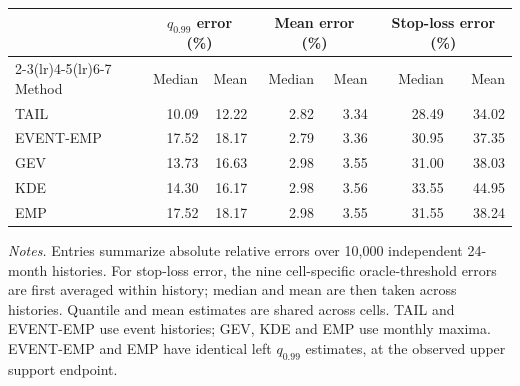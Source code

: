 \documentclass[Times1COL]{WileyNJDv5}
\providecommand{\tablebodyfont}{\small}
\providecommand{\tablefootnotefont}{\small}
\begin{document}
\clearpage
\begingroup
\centering
{}
\label{tab:table_2}
{\tablebodyfont
\setlength{\tabcolsep}{4pt}
\renewcommand{\arraystretch}{1.15}
\begin{tabular*}{\linewidth}{@{\extracolsep{\fill}}lrrrrrr@{}}
\toprule
&\multicolumn{2}{c}{$q_{0.99}$ error (\%)}&\multicolumn{2}{c}{Mean error (\%)}&\multicolumn{2}{c}{Stop-loss error (\%)}\\
\cmidrule(lr){2-3}\cmidrule(lr){4-5}\cmidrule(lr){6-7}
Method & Median & Mean & Median & Mean & Median & Mean\\
\midrule
TAIL & 10.09 & 12.22 & 2.82 & 3.34 & 28.49 & 34.02\\
EVENT-EMP & 17.52 & 18.17 & 2.79 & 3.36 & 30.95 & 37.35\\
GEV & 13.73 & 16.63 & 2.98 & 3.55 & 31.00 & 38.03\\
KDE & 14.30 & 16.17 & 2.98 & 3.56 & 33.55 & 44.95\\
EMP & 17.52 & 18.17 & 2.98 & 3.55 & 31.55 & 38.24\\\bottomrule
\end{tabular*}}
\par\smallskip
{\tablefootnotefont\textit{Notes.}
Entries summarize absolute relative errors over 10,000 independent 24-month histories.
For stop-loss error, the nine cell-specific oracle-threshold errors are first averaged within history; median and mean are then taken across histories. Quantile and mean estimates are shared across cells. TAIL and EVENT-EMP use event histories; GEV, KDE and EMP use monthly maxima. EVENT-EMP and EMP have identical left $q_{0.99}$ estimates, at the observed upper support endpoint.}
\endgroup
\end{document}
